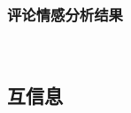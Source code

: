 \documentclass[cs4size,a4paper]{ctexart}
\numberwithin{equation}{section}
\numberwithin{table}{section}
\numberwithin{figure}{section}
\newcommand{\upcite}[1]{\textsuperscript{\textsuperscript{\cite{#1}}}}%
\begin{document}

\subsubsection{评论情感分析结果}~\label{subsec:sentiment_result}


\subsection{互信息}





\end{document}
